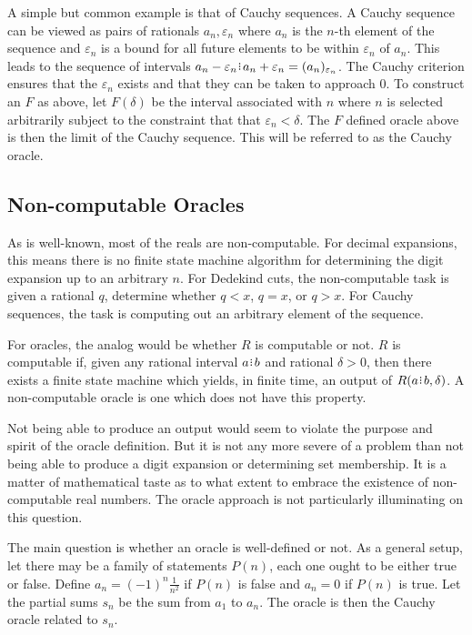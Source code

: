 \documentclass[12pt]{article}
\begin{document}
A simple but common example is that of Cauchy sequences. A Cauchy sequence can be viewed as pairs of rationals $a_n, \varepsilon_n$ where $a_n$ is the $n$-th element of the sequence and $\varepsilon_n$ is a bound for all future elements to be within $\varepsilon_n$ of $a_n$. This leads to the sequence of intervals $a_n-\varepsilon_n\rint a_n+\varepsilon_n = \halo[ \varepsilon_n]{a_n}$. The Cauchy criterion ensures that the $\varepsilon_n$ exists and that they can be taken to approach $0$. To construct an $F$ as above, let $F(\delta)$ be the interval associated with $n$ where $n$  is selected arbitrarily subject to the constraint that that $\varepsilon_n < \delta$. The $F$ defined oracle above is then the limit of the Cauchy sequence. This will be referred to as the Cauchy oracle. 
 

\subsection{Non-computable Oracles}

As is well-known, most of the reals are non-computable. For decimal expansions, this means there is no finite state machine algorithm for determining the digit expansion up to an arbitrary $n$. For Dedekind cuts, the non-computable task is given a rational $q$, determine whether $q < x$, $q = x$, or $q > x$. For Cauchy sequences, the task is computing out an arbitrary element of the sequence. 

For oracles, the analog would be whether $R$ is computable or not. $R$ is computable if, given any rational interval $a\rint b$ and rational $\delta > 0$, then there exists a finite state machine which yields, in finite time, an output of $R(a\rint b, \delta)$. A non-computable oracle is one which does not have this property. 

Not being able to produce an output would seem to violate the purpose and spirit of the oracle definition. But it is not any more severe of a problem than not being able to produce a digit expansion or determining set membership. It is a matter of mathematical taste as to what extent to embrace the existence of non-computable real numbers. The oracle approach is not particularly illuminating on this question. 

The main question is whether an oracle is well-defined or not. As a general setup, let there may be a family of statements $P(n)$, each one ought to be either true or false. Define $a_n = (-1)^n \frac{1}{n^2}$ if $P(n)$ is false and $a_n = 0$ if $P(n)$ is true. Let the partial sums $s_n$ be the sum from $a_1$ to $a_n$. The oracle is then the Cauchy oracle related to $s_n$.
\end{document}

